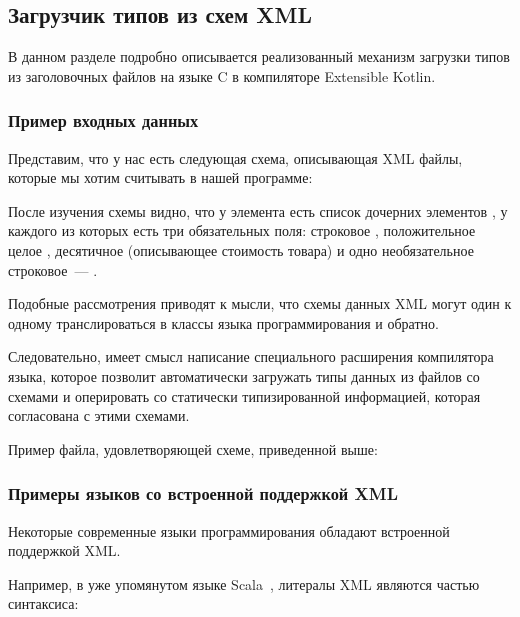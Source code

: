 \clearpage
\subsection{Загрузчик типов из схем XML}\label{xml-loader}

В данном разделе подробно описывается реализованный механизм загрузки типов из заголовочных файлов на языке C в компиляторе Extensible Kotlin.

\begin{code}
\subsubsection{Пример входных данных}
Представим, что у нас есть следующая схема, описывающая XML файлы, которые мы хотим считывать в нашей программе:

\end{code}

После изучения схемы видно, что у элемента  есть список дочерних элементов , у каждого из которых есть три обязательных поля: строковое , положительное целое , десятичное  (описывающее стоимость товара) и одно необязательное строковое~--- .

Подобные рассмотрения приводят к мысли, что схемы данных XML могут один к одному транслироваться в классы языка программирования и обратно.

Следовательно, имеет смысл написание специального расширения компилятора языка, которое позволит автоматически загружать типы данных из файлов со схемами и оперировать со статически типизированной информацией, которая согласована с этими схемами.

\begin{code}
Пример файла, удовлетворяющей схеме, приведенной выше:

\end{code}

\subsubsection{Примеры языков со встроенной поддержкой XML}
Некоторые современные языки программирования обладают встроенной поддержкой XML.

Например, в уже упомянутом языке Scala~\cite{scala-spec}, литералы XML являются частью синтаксиса:

